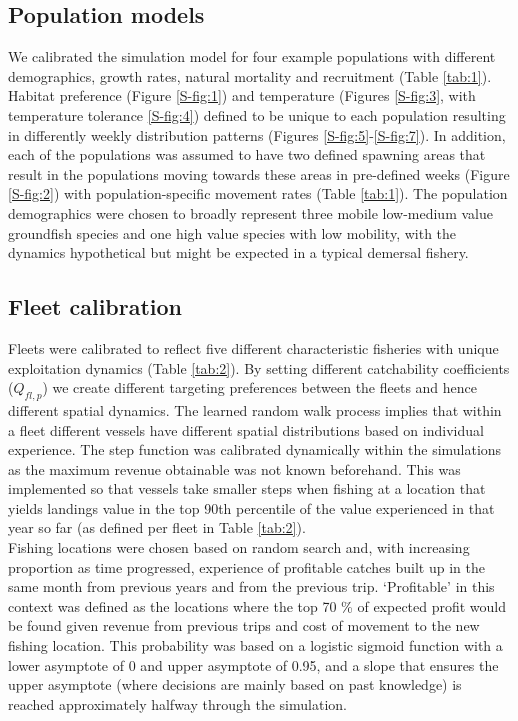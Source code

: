 \documentclass[preprint]{elsarticle}
\begin{document}
\subsection{Population models}

We calibrated the simulation model for four example populations with different
demographics, growth rates, natural mortality and recruitment (Table
\ref{tab:1}). Habitat preference (Figure \ref{S-fig:1}) and temperature
(Figures \ref{S-fig:3}, with temperature tolerance \ref{S-fig:4}) defined to be
unique to each population resulting in differently weekly distribution patterns
(Figures \ref{S-fig:5}-\ref{S-fig:7}). In addition, each of the populations was
assumed to have two defined spawning areas that result in the populations
moving towards these areas in pre-defined weeks (Figure \ref{S-fig:2}) with
population-specific movement rates (Table \ref{tab:1}). The population
demographics were chosen to broadly represent three mobile low-medium value
groundfish species and one high value species with low mobility, with the
dynamics hypothetical but might be expected in a typical demersal fishery.

\subsection{Fleet calibration}

Fleets were calibrated to reflect five different characteristic fisheries with
unique exploitation dynamics (Table \ref{tab:2}). By setting different
catchability coefficients ($Q_{fl, p}$) we create different targeting
preferences between the fleets and hence different spatial dynamics. The
learned random walk process implies that within a fleet different vessels have
different spatial distributions based on individual experience. The step
function was calibrated dynamically within the simulations as the maximum
revenue obtainable was not known beforehand. This was implemented so that
vessels take smaller steps when fishing at a location that yields landings
value in the top 90th percentile of the value experienced in that year so far
(as defined per fleet in Table \ref{tab:2}). \\

Fishing locations were chosen based on random search and, with increasing
proportion as time progressed, experience of profitable catches built up in the
same month from previous years and from the previous trip. `Profitable' in
this context was defined as the locations where the top 70 \% of expected
profit would be found given revenue from previous trips and cost of movement to
the new fishing location. This probability was based on a logistic sigmoid
function with a lower asymptote of 0 and upper asymptote of 0.95, and a slope
that ensures the upper asymptote (where decisions are mainly based on past
knowledge) is reached approximately halfway through the simulation.  \\
\end{document}
